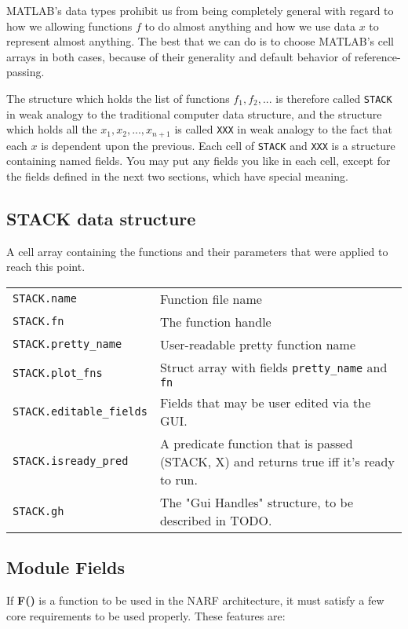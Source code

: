 \documentclass{article}
\newcommand{\matlab}[1]{\texttt{#1}}
\begin{document}
MATLAB's data types prohibit us from being completely general with regard to how we allowing functions $f$ to do almost anything and how we use data $x$ to represent almost anything. The best that we can do is to choose MATLAB's cell arrays in both cases, because of their generality and default behavior of reference-passing.

The structure which holds the list of functions $f_1, f_2, ...$ is therefore called \matlab{STACK} in weak analogy to the traditional computer data structure, and the structure which holds all the $x_1, x_2, ..., x_{n+1}$ is called \matlab{XXX} in weak analogy to the fact that each $x$ is dependent upon the previous. Each cell of \matlab{STACK} and \matlab{XXX} is a structure containing named fields. You may put any fields you like in each cell, except for the fields defined in the next two sections, which have special meaning.

\subsection{STACK data structure}

  A cell array containing the functions and their parameters that were applied to reach this point. 

\begin{tabular}{l|p{4in}}
\matlab{STACK{}.name} & Function file name \\
\matlab{STACK{}.fn}             &  The function handle\\
\matlab{STACK{}.pretty\_name}    &  User-readable pretty function name\\
\matlab{STACK{}.plot\_fns}       &  Struct array with fields \matlab{pretty\_name} and \matlab{fn}  \\
\matlab{STACK{}.editable\_fields} & Fields that may be user edited via the GUI.\\
\matlab{STACK{}.isready\_pred}    &  A predicate function that is passed (STACK, X) and returns true iff it's ready to run.\\
\matlab{STACK{}.gh}              & The "Gui Handles" structure, to be described in TODO.\\
\end{tabular}

\subsection{Module Fields}

If \textbf{F()} is a function to be used in the NARF architecture, it must satisfy a few core requirements to be used properly. These features are:
\end{document}
